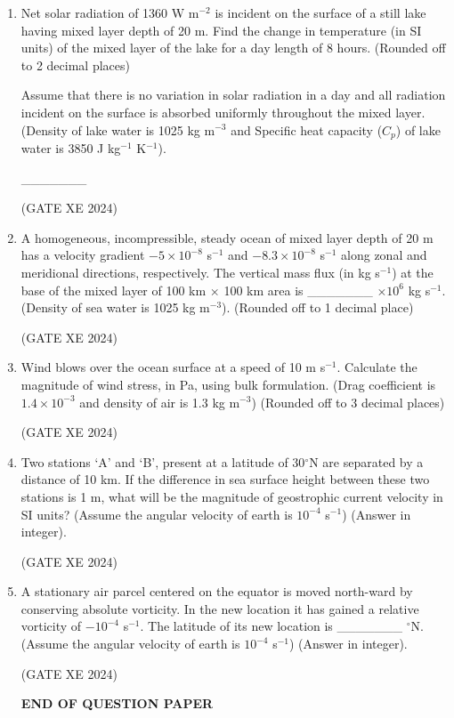 \documentclass[12pt]{article}
\begin{document}
\begin{enumerate}
(GATE XE 2024)

\item Net solar radiation of 1360 W m$^{-2}$ is incident on the surface of a still lake having mixed layer depth of 20 m.  
Find the change in temperature (in SI units) of the mixed layer of the lake for a day length of 8 hours.  
(Rounded off to 2 decimal places)  

Assume that there is no variation in solar radiation in a day and all radiation incident on the surface is absorbed uniformly throughout the mixed layer.  
(Density of lake water is 1025 kg m$^{-3}$ and Specific heat capacity ($C_p$) of lake water is 3850 J kg$^{-1}$ K$^{-1}$).  

\_\_\_\_\_\_\_  

(GATE XE 2024)

\item A homogeneous, incompressible, steady ocean of mixed layer depth of 20 m has a velocity gradient $-5 \times 10^{-8}$ s$^{-1}$ and $-8.3 \times 10^{-8}$ s$^{-1}$ along zonal and meridional directions, respectively.  
The vertical mass flux (in kg s$^{-1}$) at the base of the mixed layer of 100 km $\times$ 100 km area is \_\_\_\_\_\_\_ $\times 10^{6}$ kg s$^{-1}$.  
(Density of sea water is 1025 kg m$^{-3}$).  
(Rounded off to 1 decimal place)  

(GATE XE 2024)

\item Wind blows over the ocean surface at a speed of 10 m s$^{-1}$.  
Calculate the magnitude of wind stress, in Pa, using bulk formulation.  
(Drag coefficient is $1.4 \times 10^{-3}$ and density of air is 1.3 kg m$^{-3}$)  
(Rounded off to 3 decimal places)  

(GATE XE 2024)

\item Two stations ‘A’ and ‘B’, present at a latitude of 30$^{\circ}$N are separated by a distance of 10 km.  
If the difference in sea surface height between these two stations is 1 m, what will be the magnitude of geostrophic current velocity in SI units?  
(Assume the angular velocity of earth is $10^{-4}$ s$^{-1}$) (Answer in integer).   

(GATE XE 2024)

\item A stationary air parcel centered on the equator is moved north-ward by conserving absolute vorticity.  
In the new location it has gained a relative vorticity of $-10^{-4}$ s$^{-1}$.  
The latitude of its new location is \_\_\_\_\_\_\_ $^{\circ}$N.  
(Assume the angular velocity of earth is $10^{-4}$ s$^{-1}$) (Answer in integer).  

(GATE XE 2024)

\begin{center}
    {\Large \textbf{END OF QUESTION PAPER}}
\end{center}



\end{enumerate}
\end{document}
